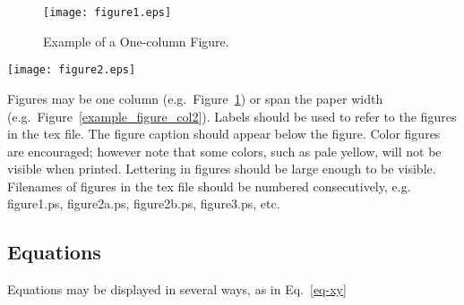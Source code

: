 %



\begin{figure}[h]
\centering
\texttt{[image: figure1.eps]}
\caption{Example of a One-column Figure.} \label{example_figure}
\end{figure}

\begin{figure*}[t]
\centering
\texttt{[image: figure2.eps]}
\caption{Example of a Full Width Figure.} \label{example_figure_col2}
\end{figure*}

Figures may be one column (e.g.~Figure~\ref{example_figure}) 
or span the paper width (e.g.~Figure~\ref{example_figure_col2}).
Labels should be used to refer to the figures in the tex file.
The figure caption should appear below the figure.  
Color figures are encouraged; however note that some colors, such as 
pale yellow, will not be visible when printed.  
Lettering in figures should be large enough to be visible.
Filenames of figures in the tex file should be numbered
consecutively, e.g. figure1.ps, figure2a.ps, figure2b.ps, figure3.ps, etc.

\subsection{Equations}
Equations may be displayed in several ways, as in Eq.~\ref{eq-xy} 

